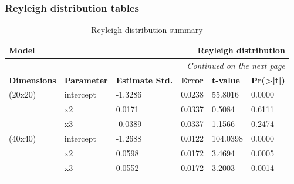 \documentclass[12pt,a4paper,twoside]{article}
\begin{document}
\subsubsection{Reyleigh distribution tables}
\begin{longtable}{l|p{}|p{}|p{}|p{}|p{}}
	\textbf{Model} & \multicolumn{5}{r}{Reyleigh distribution} \\
	\hline
	\endhead
	\hline
	\multicolumn{6}{r}{\emph{Continued on the next page}}                                                                                         \\
	\endfoot
	\hline
	\endlastfoot
	\hline
	\textbf{Dimensions} & \textbf{Parameter} & \textbf{Estimate Std.}   & \textbf{Error}  & \textbf{t-value} & \textbf{Pr(>|t|)} \\
    \hline
	(20x20)             & intercept          & -1.3286                  &  0.0238         &  55.8016         &  0.0000           \\
                        & x2                 &  0.0171                  &  0.0337         &  0.5084          &  0.6111           \\
                        & x3                 & -0.0389                  &  0.0337         &  1.1566          &  0.2474           \\
    \hline
    (40x40)             & intercept          & -1.2688                  &  0.0122         &  104.0398        &  0.0000           \\
                        & x2                 &  0.0598                  &  0.0172         &  3.4694          &  0.0005           \\
                        & x3                 &  0.0552                  &  0.0172         &  3.2003          &  0.0014           \\
    \caption{Reyleigh distribution summary}
	\label{tab:reyleighsumtab}
\end{longtable}
\end{document}
